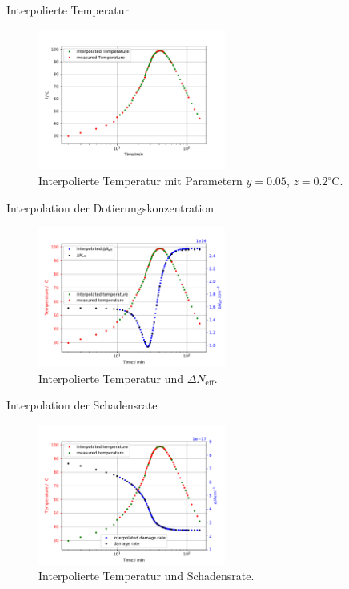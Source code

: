 \documentclass[aspectratio=1610, 9pt]{beamer}
\begin{document}
\begin{frame}{Interpolierte Temperatur}
  \begin{figure}
      \includegraphics[width=0.55\textwidth]{images/interpolationtemperatur.PDF}
  \caption{Interpolierte Temperatur mit Parametern $y=0.05$, $z=0.2^\circ$C.}
  \end{figure}
\end{frame}

\begin{frame}{Interpolation der Dotierungskonzentration}
  \begin{figure}
      \includegraphics[width=0.55\textwidth]{images/interpolationtdata.PDF}
  \caption{Interpolierte Temperatur und $\Delta N_{\mathrm{eff}}$.}
  \end{figure}
\end{frame}


\begin{frame}{Interpolation der Schadensrate}
  \begin{figure}
      \includegraphics[width=0.55\textwidth]{images/damageinterpolation.PDF}
  \caption{Interpolierte Temperatur und Schadensrate.}
  \end{figure}
\end{frame}
\end{document}
